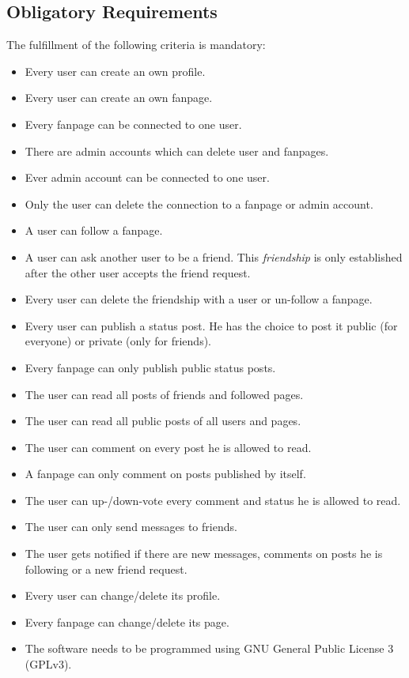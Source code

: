\documentclass[11pt,a4paper]{report}
\begin{document}
\subsection{Obligatory Requirements}
The fulfillment of the following criteria is mandatory:
\begin{itemize}
    \item Every user can create an own profile.
    \item Every user can create an own fanpage.
    \item Every fanpage can be connected to one user.
    \item There are admin accounts which can delete user and fanpages.
    \item Ever admin account can be connected to one user.
    \item Only the user can delete the connection to a fanpage or admin account.
    \item A user can follow a fanpage.
    \item A user can ask another user to be a friend. This \emph{friendship} is only established after the other user accepts the friend request.
    \item Every user can delete the friendship with a user or un-follow a fanpage.
    \item Every user can publish a status post. He has the choice to post it public (for everyone) or private (only for friends).
    \item Every fanpage can only publish public status posts.
    \item The user can read all posts of friends and followed pages.
    \item The user can read all public posts of all users and pages.
    \item The user can comment on every post he is allowed to read.
    \item A fanpage can only comment on posts published by itself.
    \item The user can up-/down-vote every comment and status he is allowed to read.
    \item The user can only send messages to friends.
    \item The user gets notified if there are new messages, comments on posts he is following or a new friend request.
    \item Every user can change/delete its profile.
    \item Every fanpage can change/delete its page.
    \item The software needs to be programmed using GNU General Public License 3 (GPLv3).
\end{itemize}
\end{document}
